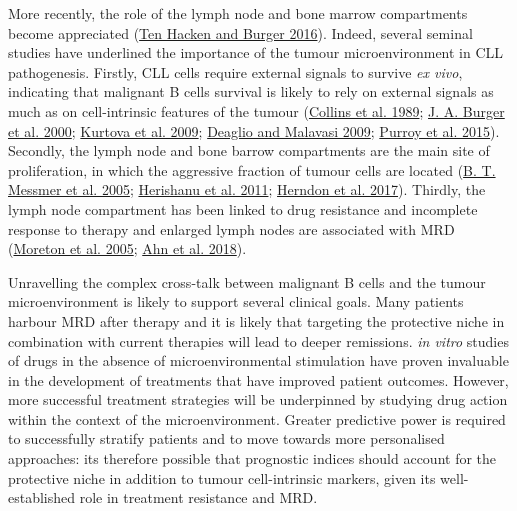 \documentclass[11pt, a4paper, twosided]{book}
\begin{document}
More recently, the role of the lymph node and bone marrow compartments become appreciated (\protect\hyperlink{ref-tenHacken2016}{Ten Hacken and Burger 2016}). Indeed, several seminal studies have underlined the importance of the tumour microenvironment in CLL pathogenesis. Firstly, CLL cells require external signals to survive \emph{ex vivo}, indicating that malignant B cells survival is likely to rely on external signals as much as on cell-intrinsic features of the tumour (\protect\hyperlink{ref-Collins1989}{Collins et al. 1989}; \protect\hyperlink{ref-Burger2000}{J. A. Burger et al. 2000}; \protect\hyperlink{ref-Kurtova2009}{Kurtova et al. 2009}; \protect\hyperlink{ref-Deaglio2009}{Deaglio and Malavasi 2009}; \protect\hyperlink{ref-Purroy2015}{Purroy et al. 2015}). Secondly, the lymph node and bone barrow compartments are the main site of proliferation, in which the aggressive fraction of tumour cells are located (\protect\hyperlink{ref-Messmer2005}{B. T. Messmer et al. 2005}; \protect\hyperlink{ref-Herishanu2011}{Herishanu et al. 2011}; \protect\hyperlink{ref-Herndon2017}{Herndon et al. 2017}). Thirdly, the lymph node compartment has been linked to drug resistance and incomplete response to therapy and enlarged lymph nodes are associated with MRD (\protect\hyperlink{ref-Moreton2005}{Moreton et al. 2005}; \protect\hyperlink{ref-Ahn2018}{Ahn et al. 2018}).

Unravelling the complex cross-talk between malignant B cells and the tumour microenvironment is likely to support several clinical goals. Many patients harbour MRD after therapy and it is likely that targeting the protective niche in combination with current therapies will lead to deeper remissions. \emph{in vitro} studies of drugs in the absence of microenvironmental stimulation have proven invaluable in the development of treatments that have improved patient outcomes. However, more successful treatment strategies will be underpinned by studying drug action within the context of the microenvironment. Greater predictive power is required to successfully stratify patients and to move towards more personalised approaches: its therefore possible that prognostic indices should account for the protective niche in addition to tumour cell-intrinsic markers, given its well-established role in treatment resistance and MRD.
\end{document}
